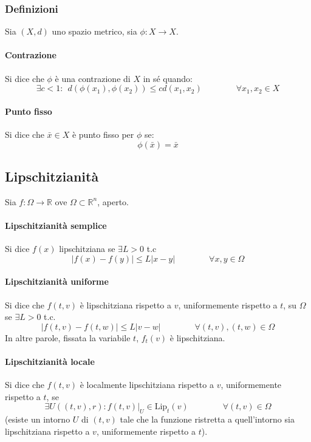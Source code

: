 \documentclass[a4paper,12pt]{article}
\begin{document}
\subsubsection{Definizioni}
Sia $(X, d)$ uno spazio metrico, sia $\phi : X\rightarrow X$.
\paragraph{Contrazione}
Si dice che $\phi$ è una contrazione di $X$ in sé quando:
$$\exists c < 1:\ \ d(\phi(x_1), \phi(x_2)) \leq cd(x_1, x_2)\qquad\qquad\forall x_1, x_2 \in X$$
\paragraph{Punto fisso}
Si dice che $\bar{x}\in X$ è punto fisso per $\phi$ se:
$$\phi(\bar{x})=\bar{x}$$

\subsection{Lipschitzianità}
Sia $f:\Omega\rightarrow\mathbb{R}$ ove $\Omega\subset\mathbb{R}^n$, aperto.
\paragraph{Lipschitzianità semplice}
Si dice $f\left(x\right)$ lipschitziana se $\exists L>0$ t.c
$$ |f\left(x\right)- f\left(y\right)| \leq L|x-y|\qquad\qquad\forall x,y \in \Omega $$

\paragraph{Lipschitzianità uniforme}
Si dice che $f(t, v)$ è lipschitziana rispetto a $v$, uniformemente rispetto a $t$, su $\Omega$ se $\exists L>0$ t.c.
$$|f(t, v) - f(t, w)| \leq L|v-w|\qquad\qquad\forall (t,v), (t, w) \in \Omega$$
In altre parole, fissata la variabile $t$, $f_t(v)$ è lipschitziana.

\paragraph{Lipschitzianità locale}
Si dice che $f(t, v)$ è localmente lipschitziana rispetto a $v$, uniformemente rispetto a $t$, se
$$\exists U((t, v), r) : f(t, v)|_U \in \text{Lip}_t(v)\qquad\qquad\forall(t, v)\in \Omega$$
(esiste un intorno $U$ di $(t, v)$ tale che la funzione ristretta a quell'intorno sia lipschitziana rispetto a $v$, uniformemente rispetto a $t$).
\end{document}
